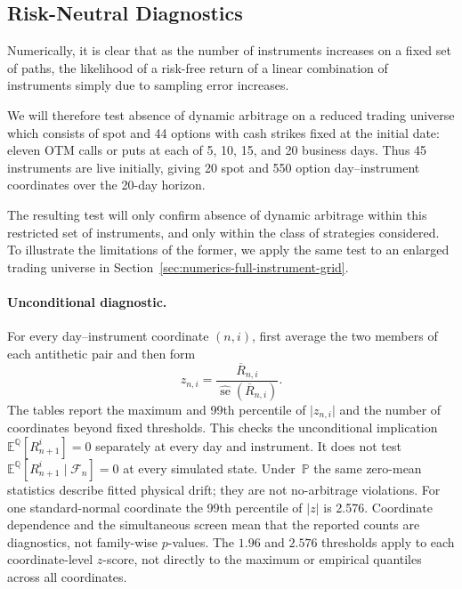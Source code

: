 \documentclass[smallextended,envcountsame,envcountsect]{svjour3}
\newcommand{\E}{\mathbb E}
\newcommand{\Q}{\mathbb Q}
\newcommand{\PP}{\mathbb P}
\newcommand{\abs}[1]{\lvert #1\rvert}
\begin{document}
\subsection{Risk-Neutral Diagnostics}
\label{sec:numerics-audit-definition}

Numerically, it is clear that as the number
of instruments increases on a fixed set of paths, the likelihood of a risk-free return
of a linear combination of instruments simply due to sampling error increases.

We will therefore test absence of dynamic arbitrage on a reduced trading universe which consists of spot and
44 options with cash strikes fixed at the initial date: eleven OTM calls or
puts at each of 5, 10, 15, and 20 business days.  Thus 45 instruments are live
initially, giving 20 spot and 550 option day--instrument coordinates over the
20-day horizon. 

The resulting test will only confirm absence of dynamic arbitrage within this restricted set of instruments, 
and only within the class of strategies considered. To illustrate the limitations of the former,
we apply the same test to an enlarged trading universe
in Section~\ref{sec:numerics-full-instrument-grid}.

\paragraph{Unconditional diagnostic.}
For every day--instrument coordinate $(n,i)$, first average the two members of
each antithetic pair and then form
\begin{equation}\label{eq:numerics-z-score}
  z_{n,i}
  =\frac{\overline R_{n,i}}
  {\widehat{\operatorname{se}}(\overline R_{n,i})}.
\end{equation}
The tables report the maximum and 99th percentile of $\abs{z_{n,i}}$ and the
number of coordinates beyond fixed thresholds.  This checks the unconditional
implication $\E^\Q[R_{n+1}^i]=0$ separately at every day and instrument.  It
does not test $\E^\Q[R_{n+1}^i\mid\mathcal F_n]=0$ at every simulated state.
Under~$\PP$ the same zero-mean statistics describe fitted physical drift; they
are not no-arbitrage violations.  For one standard-normal coordinate the 99th
percentile of $\abs{z}$ is 2.576.  Coordinate dependence and the simultaneous
screen mean that the reported counts are diagnostics, not family-wise
$p$-values.  The $1.96$ and $2.576$ thresholds apply to each coordinate-level
$z$-score, not directly to the maximum or empirical quantiles across all
coordinates.
\end{document}
